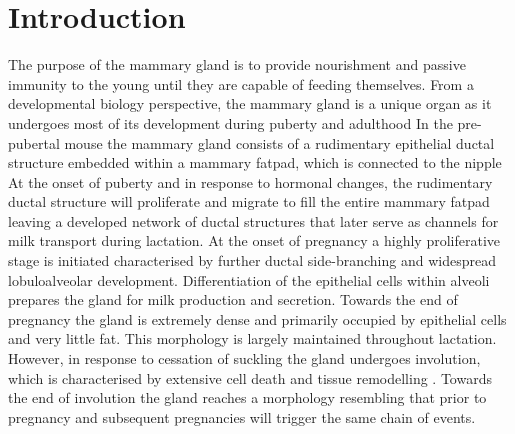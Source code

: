 \documentclass[titlepage, 12pt, oneside]{amsart}
\begin{document}
\newpage

\section{Introduction}
The purpose of the mammary gland is to provide nourishment and passive immunity to the young until they are capable of feeding themselves.
From a developmental biology perspective, the mammary gland is a unique organ as it undergoes most of its development during puberty and adulthood\autocite{Watson2008,Hennighausen2005,Hennighausen1998,Inman2015}
In the pre-pubertal mouse the mammary gland consists of a rudimentary epithelial ductal structure embedded within a mammary fatpad, which is connected to the nipple\autocite{Mikkola2006,Hens2005}
At the onset of puberty and in response to hormonal changes, the rudimentary ductal structure will proliferate and migrate to fill the entire mammary fatpad leaving a developed network of ductal structures that later serve as channels for milk transport during lactation.
At the onset of pregnancy a highly proliferative stage is initiated characterised by further ductal side-branching and widespread lobuloalveolar development\autocite{Watson2008}.
Differentiation of the epithelial cells within alveoli prepares the gland for milk production and secretion.
Towards the end of pregnancy the gland is extremely dense and primarily occupied by epithelial cells and very little fat.
This morphology is largely maintained throughout lactation.
However, in response to cessation of suckling the gland undergoes involution, which is characterised by extensive cell death and tissue remodelling \autocite{Inman2015,Watson2006} .
Towards the end of involution the gland reaches a morphology resembling that prior to pregnancy and subsequent pregnancies will trigger the same chain of events.
\end{document}
